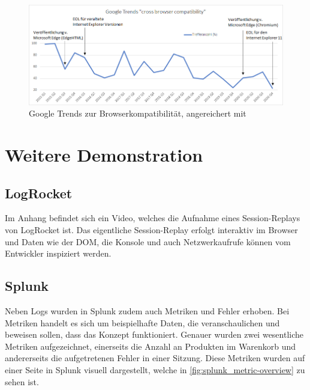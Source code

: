 \begin{figure}[H]
	\centering
	\includegraphics[width=0.84\linewidth]{img/99_postscript/google-trends_cross-browser-compatability.png}
	\caption{Google Trends zur Browserkompatibilität, angereichert mit \cite{MicrosoftIEandEdgeLifecycleFAQ}}
	\label{fig:google-search-trends_cross-browser-compatability}
\end{figure}

\section{Weitere Demonstration}
\label{sec:weitere-demonstration}

\subsection{LogRocket}
\label{sec:demo-logrocket}

Im Anhang befindet sich ein Video, welches die Aufnahme eines Session-Replays von LogRocket ist. Das eigentliche Session-Replay erfolgt interaktiv im Browser und Daten wie der DOM, die Konsole und auch Netzwerkaufrufe können vom Entwickler inspiziert werden.

\subsection{Splunk}
\label{sec:demo-splunk}

Neben Logs wurden in Splunk zudem auch Metriken und Fehler erhoben. Bei Metriken handelt es sich um beispielhafte Daten, die veranschaulichen und beweisen sollen, dass das Konzept funktioniert. Genauer wurden zwei wesentliche Metriken aufgezeichnet, einerseits die Anzahl an Produkten im Warenkorb und andererseits die aufgetretenen Fehler in einer Sitzung. Diese Metriken wurden auf einer Seite in Splunk visuell dargestellt, welche in \autoref{fig:splunk_metric-overview} zu sehen ist.

